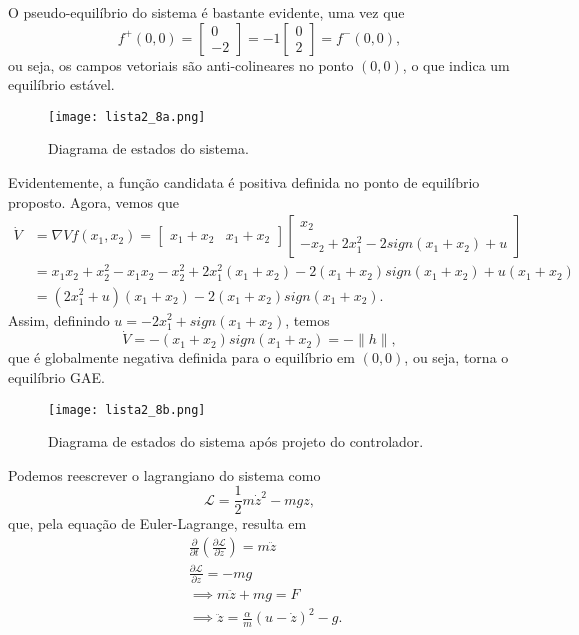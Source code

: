 \documentclass[a4paper]{report}
\begin{document}
O pseudo-equilíbrio do sistema é bastante evidente, uma vez que \[
    f^+(0,0) = \begin{bmatrix} 0 \\ -2 \end{bmatrix} = -1 \begin{bmatrix} 0 \\ 2 \end{bmatrix} = f^-(0,0)
,\] ou seja, os campos vetoriais são anti-colineares no ponto $(0,0)$, o que indica um equilíbrio estável.

\begin{figure}[H]
    \centering
    \texttt{[image: lista2\_8a.png]}
    \caption{Diagrama de estados do sistema.}
    \label{fig:lista2_8a-png}
\end{figure}


Evidentemente, a função candidata é positiva definida no ponto de equilíbrio proposto. Agora, vemos que 
\begin{align*}
    \dot{V} &= \nabla V f(x_1,x_2) = \begin{bmatrix} 
	x_1+x_2 & x_1+x_2
    \end{bmatrix} \begin{bmatrix} 
    x_2 \\
    -x_2 + 2x_1^2 -2 sign\left( x_1+x_2 \right) +u
    \end{bmatrix} \\
	    &= x_1x_2 + x_2^2 -x_1x_2 -x_2^2 +2x_1^2\left( x_1+x_2 \right)  -2\left( x_1+x_2 \right)  sign\left( x_1+x_2 \right) +u\left( x_1+x_2 \right) \\
	    &= \left( 2x_1^2 + u \right)\left( x_1+x_2 \right)   -2\left( x_1+x_2 \right)  sign\left( x_1+x_2 \right)
.\end{align*}
Assim, definindo $u = -2x_1^2 +sign\left( x_1+x_2 \right) $, temos \[
\dot{V} = -\left( x_1+x_2 \right)  sign\left( x_1+x_2 \right) = -\|h\|
,\] que é globalmente negativa definida para o equilíbrio em $(0,0)$,  ou seja, torna o equilíbrio GAE.

\begin{figure}[H]
    \centering
    \texttt{[image: lista2\_8b.png]}
    \caption{Diagrama de estados do sistema após projeto do controlador.}
    \label{fig:lista2_8b-png}
\end{figure}



Podemos reescrever o lagrangiano do sistema como \[
\mathcal{L} = \frac{1}{2}m \dot{z}^2 - mgz
,\] que, pela equação de Euler-Lagrange, resulta em
\begin{align*}
    &\frac{\partial }{\partial t} \left( \frac{\partial \mathcal{L}}{\partial \dot{z}}  \right) = m \ddot{z} \\
    &\frac{\partial \mathcal{L}}{\partial z} = -mg \\
    &\implies m \ddot{z} +mg = F \\
    &\implies \ddot{z} = \frac{\alpha}{m}\left( u - \dot{z} \right)^2 - g
.\end{align*}
\end{document}
